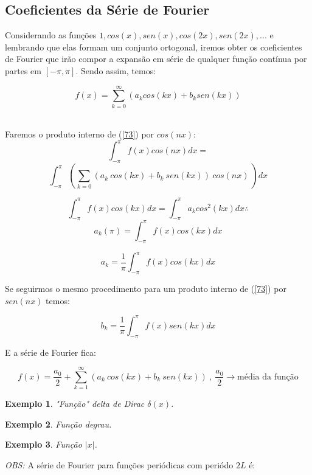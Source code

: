 \documentclass[a4paper,portuguese,9pt,final]{extarticle}
\newtheorem{example}{Exemplo}[section]
\begin{document}
\begin{multicols*}{2}
        \subsection{Coeficientes da Série de Fourier}

        
        Considerando as funções $ 1, cos(x), sen(x), cos(2x), sen(2x), ... $ e lembrando que elas formam um conjunto ortogonal, iremos obter os coeficientes de Fourier que irão compor a expansão em série de qualquer função contínua por partes em $ [-\pi,\pi] $. Sendo assim, temos:

        \begin{equation} \label{73}
        f(x)=\sum_{k=0}^{\infty}(a_{k}cos(kx)+b_{k}sen(kx))
        \end{equation}\


        Faremos o produto interno de (\ref{73}) por $cos(nx)$: 
        $$  \int_{-\pi}^{\pi}f(x)cos(nx)dx=$$ $$\int_{-\pi}^{\pi}\left(\sum_{k=0}(a_{k} \  cos(kx) + b_{k}\ sen(kx)) \ cos(nx) \ \right)  dx  $$

        $$  \int_{-\pi}^{\pi}f(x)cos(kx)dx=\int_{-\pi}^{\pi} a_{k} cos^{2}(kx) dx \therefore$$ 
        $$a_{k}(\pi) = \int_{-\pi}^{\pi}f(x)cos(kx)dx $$

        $$  a_{k} = \frac{1}{\pi} \int_{-\pi}^{\pi}f(x)cos(kx)dx  $$


        Se seguirmos o mesmo procedimento para um produto interno de (\ref{73}) por $ sen(nx) $ temos:

        $$  b_{k} = \frac{1}{\pi} \int_{-\pi}^{\pi}f(x)sen(kx)dx  $$


        E a série de Fourier fica:

        $$  f(x)=\frac{a_{0}}{2}+\sum_{k=1}^{\infty}(a_{k} \  cos(kx) + b_{k}\ sen(kx))\ , \ \frac{a_{0}}{2} \to \mbox{média da função}  $$

        \begin{example}	
            "Função" delta de Dirac $\delta (x)$.
        \end{example}

        \begin{example}	
            Função degrau.
        \end{example}

        \begin{example}	
            Função $|x|$.
        \end{example}

        \textit{OBS:} A série de Fourier para funções periódicas com periódo $2L$ é:


\end{multicols*}
\end{document}
